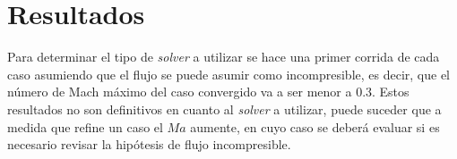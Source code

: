 


\section{Resultados}

Para determinar el tipo de \emph{solver} a utilizar se hace una primer corrida
de cada caso asumiendo que el flujo se puede asumir como incompresible, es
decir, que el número de Mach máximo del caso convergido va a ser menor a 0.3.
%
Estos resultados no son definitivos en cuanto al \emph{solver} a utilizar,
puede suceder que a medida que refine un caso el $Ma$ aumente, en cuyo caso
se deberá evaluar si es necesario revisar la hipótesis de flujo incompresible.


